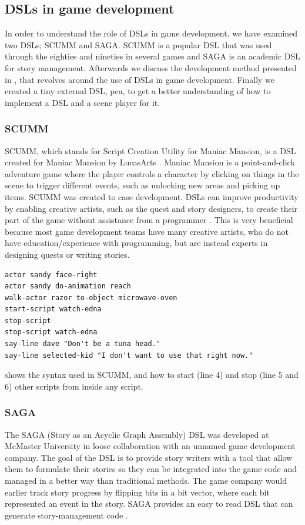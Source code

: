 \subsection{DSLs in game development}
In order to understand the role of \acp{DSL} in game development, we have examined two \acp{DSL}; SCUMM and SAGA. SCUMM is a popular \ac{DSL} that was used through the eighties and nineties in several games \cite{fandon:scumm} and SAGA \cite{beyak2011saga} is an academic \ac{DSL} for story management. Afterwards we discuss the development method presented in \cite{Walter:2011:IDL:2071423.2071475}, that revolves around the use of \acp{DSL} in game development. Finally we created a tiny external \ac{DSL}, pca, to get a better understanding of how to implement a \ac{DSL} and a scene player for it.

\subsubsection{SCUMM}
SCUMM, which stands for Script Creation Utility for Maniac Mansion, is a \ac{DSL} created for Maniac Mansion by LucasArts \cite{gamasutra:scumm}. Maniac Mansion \cite{moby:mm} is a point-and-click adventure game where the player controls a character by clicking on things in the scene to trigger different events, such as unlocking new areas and picking up items. SCUMM was created to ease development. \acp{DSL} can improve productivity by enabling creative artists, such as the quest and story designers, to create their part of the game without assistance from a programmer \cite{gamasutra:scumm}. This is very beneficial because most game development teams have many creative artists, who do not have education/experience with programming, but are instead experts in designing quests or writing stories. 

\begin{lstlisting}[caption={An example of a SCUMM script},label=lst:scumm]
actor sandy face-right
actor sandy do-animation reach
walk-actor razor to-object microwave-oven
start-script watch-edna
stop-script
stop-script watch-edna
say-line dave "Don't be a tuna head."
say-line selected-kid "I don't want to use that right now."
\end{lstlisting}
 shows the syntax used in SCUMM, and how to start (line 4) and stop (line 5 and 6) other scripts from inside any script.

\subsubsection{SAGA}
The SAGA (Story as an Acyclic Graph Assembly) \ac{DSL} \cite{beyak2011saga} was developed at McMaster University in loose collaboration with an unnamed game development company. The goal of the \ac{DSL} is to provide story writers with a tool that allow them to formulate their stories so they can be integrated into the game code and managed in a better way than traditional methods. The game company would earlier track story progress by flipping bits in a bit vector, where each bit represented an event in the story. SAGA provides an easy to read \ac{DSL} that can generate story-management code \cite{beyak2011saga}.

